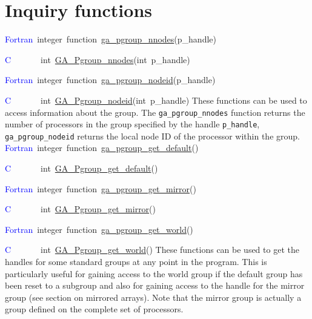 \section{Inquiry functions}
\textcolor{blue}{Fortran}~integer~function~\href{https://hpc.pnl.gov/globalarrays/api/f_op_api.html\#GA_PGROUP_NNODES}{ga\_{}pgroup\_{}nnodes}(p\_handle)

\textcolor{blue}{C}~~~~~~~int~\href{https://hpc.pnl.gov/globalarrays/api/c_op_api.html\#GA_PGROUP_NNODES}{GA\_{}Pgroup\_{}nnodes}(int~p\_handle)

\textcolor{blue}{Fortran}~integer~function~\href{https://hpc.pnl.gov/globalarrays/api/f_op_api.html\#GA_PGROUP_NODEID}{ga\_{}pgroup\_{}nodeid}(p\_handle)

\textcolor{blue}{C}~~~~~~~int~\href{https://hpc.pnl.gov/globalarrays/api/c_op_api.html\#GA_PGROUP_NODEID}{GA\_{}Pgroup\_{}nodeid}(int~p\_handle)
These functions can be used to access information about the group.
The \texttt{ga\_pgroup\_nnodes} function returns the number of processors
in the group specified by the handle \texttt{p\_handle}, \texttt{ga\_pgroup\_nodeid}
returns the local node ID of the processor within the group.
\textcolor{blue}{Fortran}~integer~function~\href{https://hpc.pnl.gov/globalarrays/api/f_op_api.html\#GA_PGROUP_GET_DEFAULT}{ga\_{}pgroup\_{}get\_{}default}()

\textcolor{blue}{C}~~~~~~~int~\href{https://hpc.pnl.gov/globalarrays/api/c_op_api.html\#GA_PGROUP_GET_DEFAULT}{GA\_{}Pgroup\_{}get\_{}default}()

\textcolor{blue}{Fortran}~integer~function~\href{https://hpc.pnl.gov/globalarrays/api/f_op_api.html\#GA_PGROUP_GET_MIRROR}{ga\_{}pgroup\_{}get\_{}mirror}()

\textcolor{blue}{C}~~~~~~~int~\href{https://hpc.pnl.gov/globalarrays/api/c_op_api.html\#GA_PGROUP_GET_MIRROR}{GA\_{}Pgroup\_{}get\_{}mirror}()

\textcolor{blue}{Fortran}~integer~function~\href{https://hpc.pnl.gov/globalarrays/api/f_op_api.html\#GA_PGROUP_GET_WORLD}{ga\_{}pgroup\_{}get\_{}world}()

\textcolor{blue}{C}~~~~~~~int~\href{https://hpc.pnl.gov/globalarrays/api/c_op_api.html\#GA_PGROUP_GET_WORLD}{GA\_{}Pgroup\_{}get\_{}world}()
These functions can be used to get the handles for some standard groups
at any point in the program. This is particularly useful for gaining
access to the world group if the default group has been reset to a
subgroup and also for gaining access to the handle for the mirror
group (see section on mirrored arrays). Note that the mirror group
is actually a group defined on the complete set of processors. 


